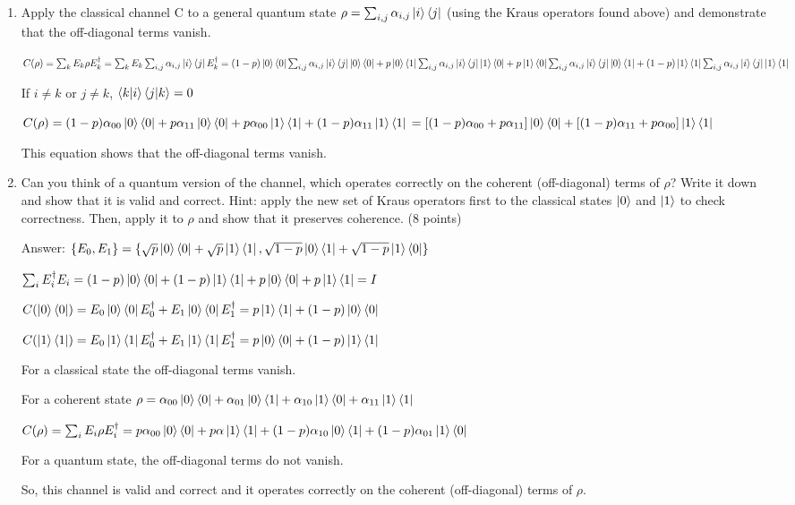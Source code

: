 \documentclass{article}
\begin{document}
\begin{enumerate}
    \item Apply the classical channel C to a general quantum state $\rho = \sum_{i,j} \alpha_{i,j} \ket{i}\bra{j}$ (using the Kraus operators found above) and demonstrate that the off-diagonal terms vanish.

          $C(\rho)=\sum_k E_k\rho E_k^\dagger
              \\=\sum_k E_k\sum_{i,j} \alpha_{i,j} \ket{i}\bra{j} E_k^\dagger
              \\=(1-p)\ket{0}\bra{0}\sum_{i,j} \alpha_{i,j} \ket{i}\bra{j}\ket{0}\bra{0}+p\ket{0}\bra{1}\sum_{i,j} \alpha_{i,j} \ket{i}\bra{j}\ket{1}\bra{0}+p\ket{1}\bra{0}\sum_{i,j} \alpha_{i,j} \ket{i}\bra{j}\ket{0}\bra{1}+(1-p)\ket{1}\bra{1}\sum_{i,j} \alpha_{i,j} \ket{i}\bra{j}\ket{1}\bra{1}
          $

          If $i\neq k$ or $j\neq k$, $\braket{k|i}\braket{j|k}=0$

          $C(\rho)=(1-p)\alpha_{00}\ket{0}\bra{0}+p\alpha_{11}\ket{0}\bra{0}+p\alpha_{00}\ket{1}\bra{1}+(1-p)\alpha_{11}\ket{1}\bra{1}
              \\=[(1-p)\alpha_{00}+p\alpha_{11}]\ket{0}\bra{0}+[(1-p)\alpha_{11}+p\alpha_{00}]\ket{1}\bra{1}
          $

          This equation shows that the off-diagonal terms vanish.


    \item Can you think of a quantum version of the channel, which operates correctly on the coherent (off-diagonal) terms of $\rho$? Write it down and show that it is valid and correct. Hint: apply the new set of Kraus operators first to the classical states $\ket{0}$ and $\ket{1}$ to check correctness. Then, apply it to $\rho$ and show that it preserves coherence. (8 points)

          Answer: $\{E_0,E_1\}=\{\sqrt{p}\ket{0}\bra{0}+\sqrt{p}\ket{1}\bra{1},\sqrt{1-p}\ket{0}\bra{1}+\sqrt{1-p}\ket{1}\bra{0}\}$

          $\sum_i E_i^\dagger E_i=(1-p)\ket{0}\bra{0}+(1-p)\ket{1}\bra{1}+p\ket{0}\bra{0}+p\ket{1}\bra{1}=I$

          $C(\ket{0}\bra{0})=E_0\ket{0}\bra{0}E_0^\dagger+E_1\ket{0}\bra{0}E_1^\dagger=p\ket{1}\bra{1}+(1-p)\ket{0}\bra{0}$

          $C(\ket{1}\bra{1})=E_0\ket{1}\bra{1}E_0^\dagger+E_1\ket{1}\bra{1}E_1^\dagger=p\ket{0}\bra{0}+(1-p)\ket{1}\bra{1}$


          For a classical state the off-diagonal terms vanish.

          For a coherent state $\rho=\alpha_{00}\ket{0}\bra{0}+\alpha_{01}\ket{0}\bra{1}+\alpha_{10}\ket{1}\bra{0}+\alpha_{11}\ket{1}\bra{1}$

          $C(\rho)=\sum_i E_i\rho E_i^\dagger=p\alpha_{00}\ket{0}\bra{0}+p\alpha\ket{1}\bra{1}+(1-p)\alpha_{10}\ket{0}\bra{1}+(1-p)\alpha_{01}\ket{1}\bra{0}$

          For a quantum state, the off-diagonal terms do not vanish.

          So, this channel is valid and correct and it operates correctly on the coherent (off-diagonal) terms of $\rho$.

\end{enumerate}
\end{document}
